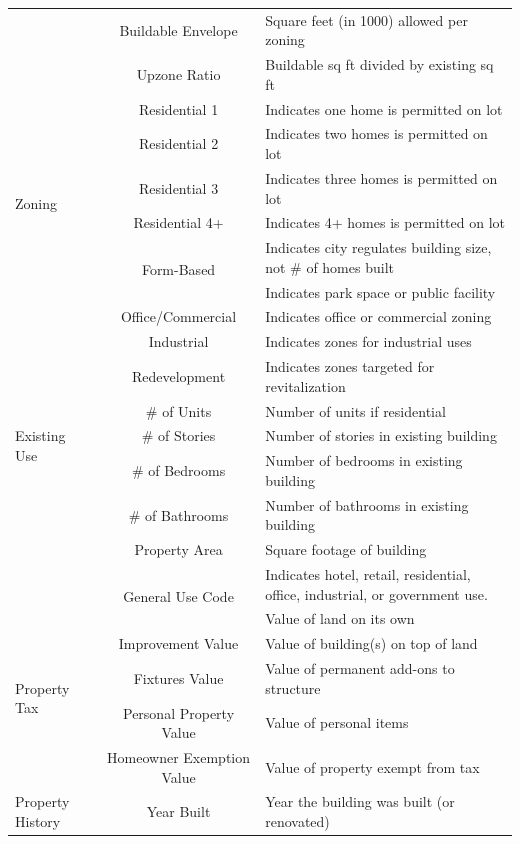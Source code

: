 \documentclass[a4paper,12pt]{article}
\begin{document}
\begin{longtable}{|p{1.6cm}|c|p{7cm}|}
\hline
\multirow{11}{2cm}{Zoning} & Buildable Envelope & Square feet (in 1000) allowed per zoning \\
& Upzone Ratio & Buildable sq ft divided by existing sq ft\\
& Residential 1 & Indicates one home is permitted on lot\\
& Residential 2 & Indicates two homes is permitted on lot\\
& Residential 3 & Indicates three homes is permitted on lot\\
& Residential 4+ & Indicates 4+ homes is permitted on lot\\
& \multirow{2}{6cm}{\centering Form-Based} & Indicates city regulates building size, not \# of homes built\\
& Public & Indicates park space or public facility \\
& Office/Commercial & Indicates office or commercial zoning \\
& Industrial & Indicates zones for industrial uses \\
& Redevelopment & Indicates zones targeted for revitalization\\
\hline
\multirow{3}{2cm}{Existing Use} & \# of Units & Number of units if residential \\
& \# of Stories & Number of stories in existing building\\
& \# of Bedrooms & Number of bedrooms in existing building\\
& \# of Bathrooms & Number of bathrooms in existing building\\
& Property Area & Square footage of building\\
& \multirow{2}{6cm}{\centering General Use Code} & Indicates hotel, retail, residential, office, industrial, or government use. \\
\hline
\multirow{5}{2cm}{Property Tax} & Land Value & Value of land on its own \\
& Improvement Value & Value of building(s) on top of land \\
& Fixtures Value & Value of permanent add-ons to structure \\
& Personal Property Value & Value of personal items \\
& Homeowner Exemption Value & Value of property exempt from tax \\
\hline
\multirow{3}{2cm}{Property History}
& Year Built & Year the building was built (or renovated) \\

\end{longtable}
\end{document}
